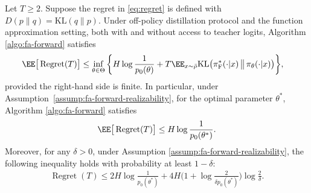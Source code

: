 \documentclass[11pt]{article}
\newcommand{\KL}{\text{KL}}
\newcommand{\pif}{\pi_{\mathrm{F}}}
\begin{document}
\begin{theorem}
\label{thm:ar-fa-forward}
Let $T \ge 2$. Suppose the regret in \eqref{eq:regret} is defined with
$D(p\|q)=\KL(q\|p)$. Under off-policy distillation protocol and the function approximation setting, both with and without access to teacher logits, Algorithm \ref{algo:fa-forward} satisfies
\begin{align}
    \EE\big[\operatorname{Regret}(T)\big]
    &\leq
    \inf_{\theta\in\Theta}
    \bigg\{
        H\log\frac1{p_0(\theta)}
        +
        T\EE_{x\sim\bar\rho}
        \KL\bigl(
            \pif^*(\cdot|x)
            \,\big\|\,
            \pi_\theta(\cdot|x)
        \bigr)
    \bigg\},
    \notag
\end{align}
provided the right-hand side is finite. In particular, under
Assumption~\ref{assump:fa-forward-realizability}, for the optimal parameter $\theta^*$, Algorithm \ref{algo:fa-forward} satisfies
\begin{align}
    \EE\big[\operatorname{Regret}(T)\big]
    \leq
    H\log\frac1{p_0(\theta^*)}.
    \notag
\end{align}
Moreover, for any $\delta>0$, under Assumption \ref{assump:fa-forward-realizability}, the following inequality holds with probability at least $1-\delta$:
\begin{align*}
    \operatorname{Regret}(T)
    \leq
    2H\log\frac1{p_0(\theta^*)}
    +
    4H\bigg(
        1+\log\frac{2}{\delta p_0(\theta^*)}
    \bigg)\log\frac2\delta.
\end{align*}
\end{theorem}
\end{document}
